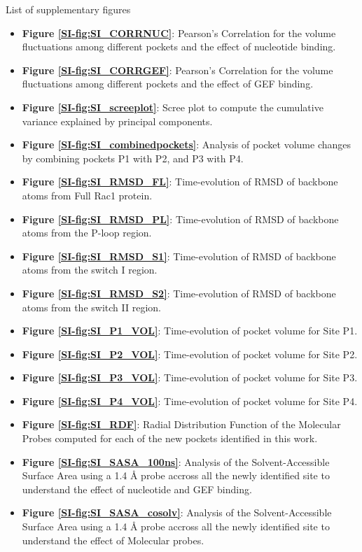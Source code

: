 \documentclass[12pt,a4paper]{achemso}
\begin{document}
\begin{suppinfo}
List of supplementary figures
\begin{itemize}
    \item \textbf{Figure \ref{SI-fig:SI_CORRNUC}}: Pearson's Correlation for the volume fluctuations among different pockets and the effect of nucleotide binding.
    \item \textbf{Figure \ref{SI-fig:SI_CORRGEF}}: Pearson's Correlation for the volume fluctuations among different pockets and the effect of GEF binding.
    \item \textbf{Figure \ref{SI-fig:SI_screeplot}}: Scree plot to compute the cumulative variance explained by principal components.
    \item \textbf{Figure \ref{SI-fig:SI_combinedpockets}}: Analysis of pocket volume changes by combining pockets P1 with P2, and P3 with P4.
    \item \textbf{Figure \ref{SI-fig:SI_RMSD_FL}}: Time-evolution of RMSD of backbone atoms from Full Rac1 protein.
    \item \textbf{Figure \ref{SI-fig:SI_RMSD_PL}}: Time-evolution of RMSD of backbone atoms from the P-loop region.
    \item \textbf{Figure \ref{SI-fig:SI_RMSD_S1}}: Time-evolution of RMSD of backbone atoms from the switch I region.
    \item \textbf{Figure \ref{SI-fig:SI_RMSD_S2}}: Time-evolution of RMSD of backbone atoms from the switch II region.
    \item \textbf{Figure \ref{SI-fig:SI_P1_VOL}}: Time-evolution of pocket volume for Site P1.
    \item \textbf{Figure \ref{SI-fig:SI_P2_VOL}}: Time-evolution of pocket volume for Site P2.
    \item \textbf{Figure \ref{SI-fig:SI_P3_VOL}}: Time-evolution of pocket volume for Site P3.
    \item \textbf{Figure \ref{SI-fig:SI_P4_VOL}}: Time-evolution of pocket volume for Site P4.
    \item \textbf{Figure \ref{SI-fig:SI_RDF}}: Radial Distribution Function of the Molecular Probes computed for each of the new pockets identified in this work.
    \item \textbf{Figure \ref{SI-fig:SI_SASA_100ns}}: Analysis of the Solvent-Accessible Surface Area using a 1.4 \r{A} probe accross all the newly identified site to understand the effect of nucleotide and GEF binding.
    \item \textbf{Figure \ref{SI-fig:SI_SASA_cosolv}}: Analysis of the Solvent-Accessible Surface Area using a 1.4 \r{A} probe accross all the newly identified site to understand the effect of Molecular probes.

\end{itemize}
\end{suppinfo}

 
\end{document}
